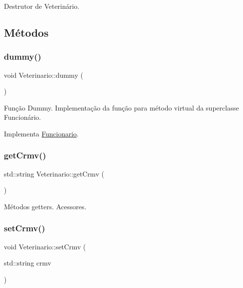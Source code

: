 Destrutor de Veterinário. 

\subsection{Métodos}
\mbox{\label{classVeterinario_a1a5663f1ff2c9717df7634e0f0d1eb8d}} 
\subsubsection{\texorpdfstring{dummy()}{dummy()}}
{\footnotesize\ttfamily void Veterinario\+::dummy (\begin{DoxyParamCaption}{ }\end{DoxyParamCaption})\hspace{0.3cm}{\ttfamily [virtual]}}

Função Dummy. Implementação da função para método virtual da superclasse Funcionário. 

Implementa \hyperlink{classFuncionario_a56aa6d780ba9ac728fad0cde3a71e9d8}{Funcionario}.

\mbox{\label{classVeterinario_ae2d7672c6d5d336a3fea497845da92c1}} 
\subsubsection{\texorpdfstring{get\+Crmv()}{getCrmv()}}
{\footnotesize\ttfamily std\+::string Veterinario\+::get\+Crmv (\begin{DoxyParamCaption}{ }\end{DoxyParamCaption})}

Métodos getters. Acessores. \mbox{\label{classVeterinario_ab2c6b24dd13132a0467983a0d17284fd}} 
\subsubsection{\texorpdfstring{set\+Crmv()}{setCrmv()}}
{\footnotesize\ttfamily void Veterinario\+::set\+Crmv (\begin{DoxyParamCaption}\item[{std\+::string}]{crmv }\end{DoxyParamCaption})}

